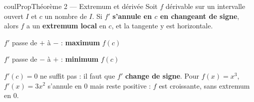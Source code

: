 \documentclass[11pt,a4paper]{article}
\makeatletter
\newcounter{lycee@signet}
\newcommand{\signet}[3][]{\stepcounter{lycee@signet}%
  \edef\lycee@dest{\if\relax\detokenize{#1}\relax
    signet.\arabic{lycee@signet}\else#1\fi}%
  \hypertarget{\lycee@dest}{}\bookmark[level=#2,dest=\lycee@dest]{#3}}
\newenvironment{proprietebox}[1][Propriété]%
  {\begin{boitecours}[phantom={\signet{2}{#1}}]{coulProp}{#1}}{\end{boitecours}}
\makeatother
\begin{document}
\begin{proprietebox}[Théorème 2 --- Extremum et dérivée]
Soit $f$ dérivable sur un intervalle ouvert $I$ et $c$ un nombre de $I$. Si $f'$
\textbf{s'annule en $c$ en changeant de signe}, alors $f$ a un \textbf{extremum local} en
$c$, et la tangente y est horizontale.

\smallskip
\begin{minipage}[t]{0.48\linewidth}\centering
{\small $f'$ passe de $+$ à $-$ : \textbf{maximum} $f(c)$}\\[4pt]
\end{minipage}\hfill
\begin{minipage}[t]{0.48\linewidth}\centering
{\small $f'$ passe de $-$ à $+$ : \textbf{minimum} $f(c)$}\\[4pt]
\end{minipage}
\end{proprietebox}

\begin{remarquebox}[Attention]
$f'(c)=0$ ne suffit pas : il faut que $f'$ \textbf{change de signe}. Pour $f(x)=x^{3}$,
$f'(x)=3x^{2}$ s'annule en $0$ mais reste positive : $f$ est croissante, sans extremum
en $0$.
\end{remarquebox}
\end{document}
